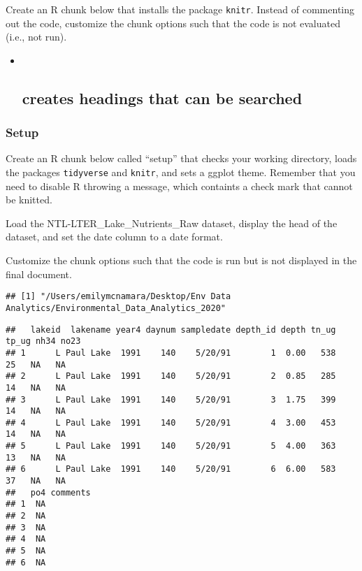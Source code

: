 \documentclass[]{article}
\begin{document}
Create an R chunk below that installs the package \texttt{knitr}.
Instead of commenting out the code, customize the chunk options such
that the code is not evaluated (i.e., not run).

\begin{itemize}
\item ~
  \subsection{creates headings that can be
  searched}\label{creates-headings-that-can-be-searched}
\end{itemize}

\subsubsection{Setup}\label{setup}

Create an R chunk below called ``setup'' that checks your working
directory, loads the packages \texttt{tidyverse} and \texttt{knitr}, and
sets a ggplot theme. Remember that you need to disable R throwing a
message, which containts a check mark that cannot be knitted.

Load the NTL-LTER\_Lake\_Nutrients\_Raw dataset, display the head of the
dataset, and set the date column to a date format.

Customize the chunk options such that the code is run but is not
displayed in the final document.

\begin{verbatim}
## [1] "/Users/emilymcnamara/Desktop/Env Data Analytics/Environmental_Data_Analytics_2020"
\end{verbatim}

\begin{verbatim}
##   lakeid  lakename year4 daynum sampledate depth_id depth tn_ug tp_ug nh34 no23
## 1      L Paul Lake  1991    140    5/20/91        1  0.00   538    25   NA   NA
## 2      L Paul Lake  1991    140    5/20/91        2  0.85   285    14   NA   NA
## 3      L Paul Lake  1991    140    5/20/91        3  1.75   399    14   NA   NA
## 4      L Paul Lake  1991    140    5/20/91        4  3.00   453    14   NA   NA
## 5      L Paul Lake  1991    140    5/20/91        5  4.00   363    13   NA   NA
## 6      L Paul Lake  1991    140    5/20/91        6  6.00   583    37   NA   NA
##   po4 comments
## 1  NA         
## 2  NA         
## 3  NA         
## 4  NA         
## 5  NA         
## 6  NA
\end{verbatim}
\end{document}
